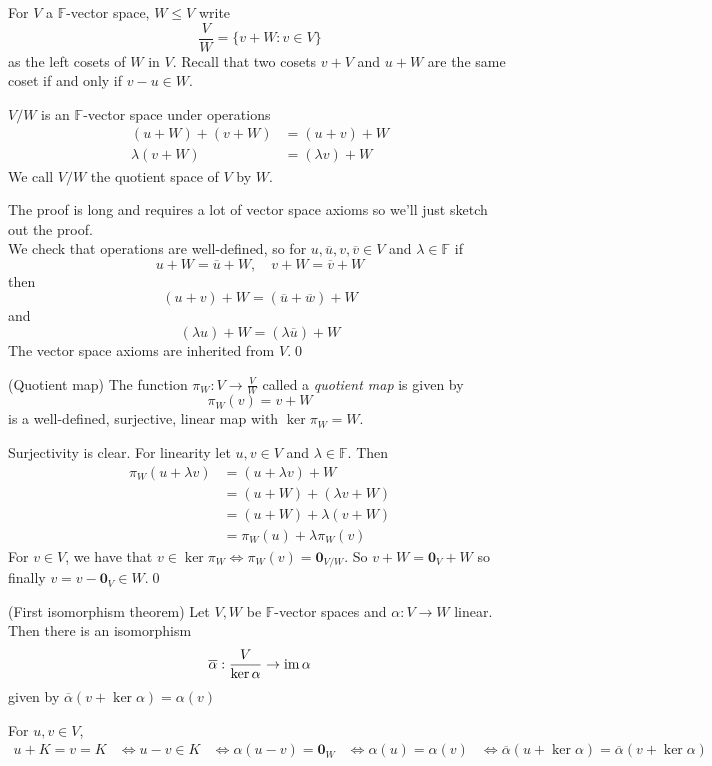 \documentclass{article}
\newcommand{\F}{\mathbb{F}}
\begin{document}
For $ V $ a $ \F $-vector space, $ W\le V $ write
	\[
		\frac VW=\{v+W:v\in V\}
	\]
	as the left cosets of $ W $ in $ V $. Recall that two cosets $ v + V $ and $ u+W $ are the same coset if and only if $ v-u\in W $.
\begin{proposition}
  $ V/W $ is an $ \F $-vector space under operations
  \begin{align*}
   (u+W)+(v+W)&=(u+v)+W \\
   \lambda (v+W)&=(\lambda v)+W
\end{align*}
We call $ V/W $ the quotient space of $ V $ by $ W $.
\end{proposition}
\pf The proof is long and requires a lot of vector space axioms so we'll just sketch out the proof.\\
We check that operations are well-defined, so for $ u,\overline u, v,\overline v \in V $ and $ \lambda\in \F $ if
\[
  u+W=\overline u + W,\quad v+W=\overline v + W
\]
then
\[
	(u+v)+W=(\overline u+\overline w)+W
\]
and
\[
	(\lambda u) + W = (\lambda\overline u)+W
\]
The vector space axioms are inherited from $ V $.\qed
\begin{proposition}
	(Quotient map) The function $ \pi_W: V\to \frac VW $ called a \textit{quotient map} is given by
  \[
    \pi_W(v)=v+W
  \]
  is a well-defined, surjective, linear map with $ \ker\pi_W=W $.
\end{proposition}
\pf Surjectivity is clear. For linearity let $ u,v \in V $ and $ \lambda\in \F $. Then 
\begin{align*}
	\pi_W(u+\lambda v)&=(u+\lambda v) + W \\
			  &= (u+W)+(\lambda v+W)\\
			  &= (u+W)+\lambda(v+W) \\
			  &= \pi_W(u)+\lambda\pi_W(v)
\end{align*}
For $ v\in V $, we have that  $ v\in\ker \pi_W \iff \pi_W(v) = \mathbf 0_{V/W} $. So $ v+W=\mathbf 0_V+W $ so finally $ v=v-\mathbf 0_V\in W $.\qed
\begin{theorem}
	(First isomorphism theorem) Let $ V,W $ be $ \F $-vector spaces and $ \alpha:V\to W  $ linear. Then there is an isomorphism
	\[
		\overline\alpha:\frac{V}{\ker \alpha}\to\operatorname{im}\alpha
	\]
	given by $ \overline\alpha(v+\ker\alpha)=\alpha(v) $
\end{theorem}
\pf For $ u,v\in V $,
\begin{align*}
	u+K=v=K &\iff u-v\in K
		&\iff \alpha(u-v)=\mathbf 0_W
		&\iff \alpha(u)=\alpha(v)
		&\iff \overline \alpha(u+\ker\alpha)=\overline\alpha(v+\ker\alpha)
\end{align*}
\end{document}
